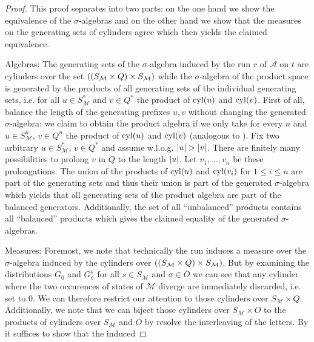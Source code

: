 \begin{proof}
  This proof separates into two parts: on the one hand we show the equivalence
  of the $\sigma$-algebras and on the other hand we show that the measures on
  the generating sets of cylinders agree which then yields the claimed
  equivalence.
\item [Algebras:]
  The generating sets of the $\sigma$-algebra induced by the run $r$ of
  $\mathcal{A}$ on $t$ are cylinders over the set
  $\left(\left(S_{\mathcal{M}}\times Q\right)\times S_{\mathcal{M}}\right)$ while the
  $\sigma$-algebra of the product space is generated by the products of all
  generating sets of the individual generating sets, i.e. for all
  $u\in S_{\mathcal{M}}^{*}$ and $v\in Q^{*}$ the product of $\operatorname{cyl}(u)$ and
  $\operatorname{cyl}(v)$. First of all, balance the length of the generating prefixes $u, v$
  without changing the generated $\sigma$-algebra: we claim to obtain the
  product algebra if we only take for every $n$ and $u\in S_{\mathcal{M}}^{n}$,
  $v\in Q^{n}$ the product of $\operatorname{cyl}(u)$ and $\operatorname{cyl}(v)$ (analogous to
  \cite[Remark 35]{RandAutoInfTrees}). Fix two arbitrary
  $u\in S_{\mathcal{M}}^{*}$, $v\in Q^{*}$ and assume w.l.o.g.
  $\left\vert{u}\right\vert > \left\vert{v}\right\vert$. There are finitely many possibilities to prolong $v$
  in $Q$ to the length $\left\vert{u}\right\vert$.  Let $v_{1},\dots, v_{n}$ be these
  prolongations. The union of the products of $\operatorname{cyl}(u)$ and $\operatorname{cyl}(v_{i})$ for
  $1\leq i\leq n$ are part of the generating sets and thus their union is part
  of the generated $\sigma$-algebra which yields that all generating sets of
  the product algebra are part of the balanced generators. Additionally, the
  set of all \enquote{unbalanced} products contains all \enquote{balanced}
  products which gives the claimed equality of the generated $\sigma$-algebras.
\item [Measures:] Foremost, we note that technically the run induces a measure
  over the $\sigma$-algebra induced by the cylinders over
  $\left(\left(S_{\mathcal{M}}\times Q\right)\times S_{\mathcal{M}}\right)$. But by
  examining the distributions $G_{0}$ and $G^{s}_{\sigma}$ for all
  $s\in S_{\mathcal{M}}$ and $\sigma\in O$ we can see that any cylinder where
  the two occurences of states of $\mathcal{M}$ diverge are immediately
  discarded, i.e. set to $0$. We can therefore restrict our attention to those
  cylinders over $S_{\mathcal{M}}\times Q$. Additionally, we note that we can
  biject those cylinders over $S_{\mathcal{M}}\times O$ to the products of
  cylinders over $S_{\mathcal{M}}$ and $O$ by resolve the interleaving of the
  letters. By \cite[Theorem 22.2]{Bauer} it suffices to show that the induced

\end{proof}
